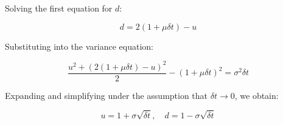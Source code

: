 \documentclass{article}
\begin{document}
Solving the first equation for \( d \):

\[
    d = 2(1 + \mu \delta t) - u
\]

Substituting into the variance equation:

\[
    \frac{u^2 + (2(1 + \mu \delta t) - u)^2}{2} - (1 + \mu \delta t)^2 = \sigma^2 \delta t
\]

Expanding and simplifying under the assumption that \( \delta t \to 0 \), we obtain:

\[
    u = 1 + \sigma \sqrt{\delta t}, \quad d = 1 - \sigma \sqrt{\delta t}
\]






\printbibliography
\end{document}
